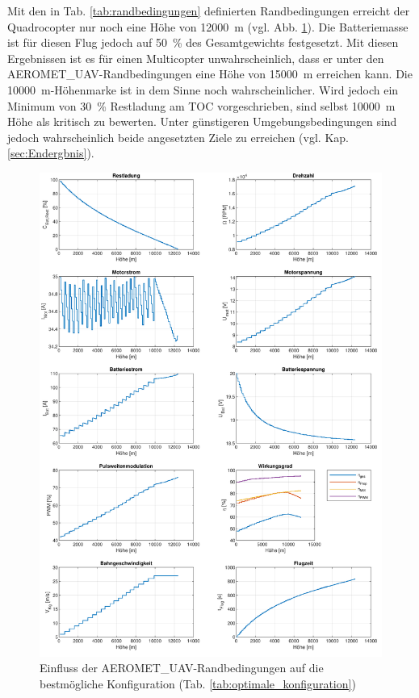 Mit den in Tab. \ref{tab:randbedingungen} definierten Randbedingungen erreicht der Quadrocopter nur noch eine Höhe von \SI{12000}{m} (vgl. Abb. \ref{abb:aeromet_rb}). Die Batteriemasse ist für diesen Flug jedoch auf \SI{50}{\%} des Gesamtgewichts festgesetzt. Mit diesen Ergebnissen ist es für einen Multicopter unwahrscheinlich, dass er unter den AEROMET\_UAV-Randbedingungen eine Höhe von \SI{15000}{m} erreichen kann. Die \SI{10000}{m}-Höhenmarke ist in dem Sinne noch wahrscheinlicher. Wird jedoch ein Minimum von \SI{30}{\%} Restladung am TOC vorgeschrieben, sind selbst \SI{10000}{m} Höhe als kritisch zu bewerten. Unter günstigeren Umgebungsbedingungen sind jedoch wahrscheinlich beide angesetzten Ziele zu erreichen (vgl. Kap. \ref{sec:Endergbnis}).

\begin{figure}[H]
\centering
	\includegraphics[scale=0.7]{Diagramme/aeromet_randbedingungen.pdf}
	\caption{Einfluss der AEROMET\_UAV-Randbedingungen auf die bestmögliche Konfiguration (Tab. \ref{tab:optimale_konfiguration})}
	\label{abb:aeromet_rb}
\end{figure}